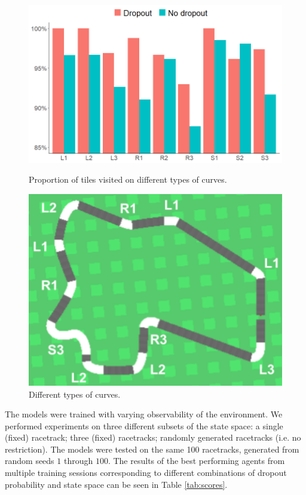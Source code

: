 \documentclass{article}
\begin{document}
\begin{figure}[!h]
\captionsetup{justification=centering}
\centering
\begin{minipage}[t]{.6\textwidth}
  \centering
  \includegraphics[width=\linewidth]{Graphics/curve_plot_v2.png}
  \caption{Proportion of tiles visited on different types of curves. }
  \label{fig:curves_comparison}
\end{minipage}
\hspace{1cm}
\begin{minipage}[t]{.3\textwidth}
  \centering
  \includegraphics[width=\linewidth]{Graphics/curves.png}
  \caption{Different types of curves. }
  \label{fig:curves}
\end{minipage}
\end{figure}

The models were trained with varying observability of the environment. We performed experiments on three different subsets of the state space: a single (fixed) racetrack; three (fixed) racetracks; randomly generated racetracks (i.e. no restriction). The models were tested on the same 100 racetracks, generated from random seeds $1$ through $100$. The results of the best performing agents from multiple training sessions corresponding to different combinations of dropout probability and state space can be seen in Table \ref{tab:scores}. 
\end{document}
